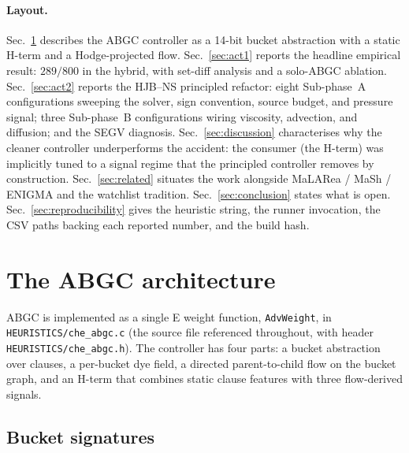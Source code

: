 \documentclass[11pt]{article}
\newcommand{\lpath}[1]{\texttt{\nolinkurl{#1}}}
\newcommand{\lid}[1]{{\ttfamily\nolinkurl{#1}}}
\begin{document}
\paragraph{Layout.}
Sec.~\ref{sec:architecture} describes the ABGC controller as a 14-bit bucket
abstraction with a static H-term and a Hodge-projected flow. Sec.~\ref{sec:act1}
reports the headline empirical result: $289/800$ in the hybrid, with set-diff
analysis and a solo-ABGC ablation. Sec.~\ref{sec:act2} reports the
HJB--NS principled refactor: eight Sub-phase~A configurations sweeping the
solver, sign convention, source budget, and pressure signal; three Sub-phase~B
configurations wiring viscosity, advection, and diffusion; and the SEGV
diagnosis. Sec.~\ref{sec:discussion} characterises why the cleaner controller
underperforms the accident: the consumer (the H-term) was implicitly tuned to a
signal regime that the principled controller removes by construction.
Sec.~\ref{sec:related} situates the work alongside MaLARea / MaSh / ENIGMA and
the watchlist tradition. Sec.~\ref{sec:conclusion} states what is open.
Sec.~\ref{sec:reproducibility} gives the heuristic string, the runner
invocation, the CSV paths backing each reported number, and the build hash.

\section{The ABGC architecture}\label{sec:architecture}

ABGC is implemented as a single E weight function, \lid{AdvWeight}, in
\lpath{HEURISTICS/che_abgc.c} (the source file referenced throughout, with
header \lpath{HEURISTICS/che_abgc.h}). The controller has four parts:
a bucket abstraction over clauses, a per-bucket dye field, a directed
parent-to-child flow on the bucket graph, and an H-term that combines static
clause features with three flow-derived signals.

\subsection{Bucket signatures}
\end{document}
